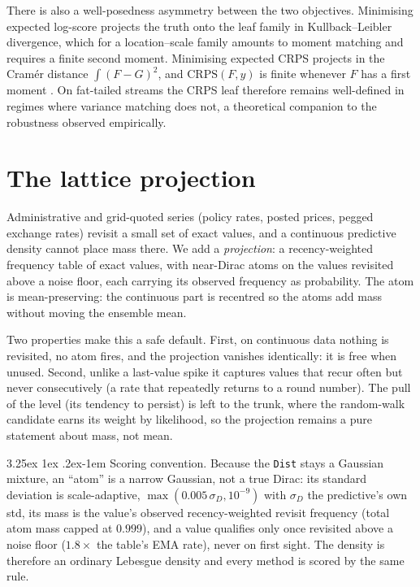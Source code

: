 \documentclass[article]{jss}
\makeatletter
\renewcommand\paragraph{\@startsection{paragraph}{4}{\z@}%
  {3.25ex \@plus1ex \@minus.2ex}{-1em}%
  {\normalfont\normalsize\itshape}}
\providecommand{\code}[1]{\texttt{#1}}
\makeatother
\begin{document}
There is also a well-posedness asymmetry between the two objectives.
Minimising expected log-score projects the truth onto the leaf family in
Kullback--Leibler divergence, which for a location--scale family amounts to
moment matching and requires a finite second moment. Minimising expected CRPS
projects in the Cram\'er distance $\int (F-G)^2$, and $\mathrm{CRPS}(F,y)$ is
finite whenever $F$ has a first moment \citep{gneiting2007strictly}. On
fat-tailed streams the CRPS leaf therefore remains well-defined in regimes
where variance matching does not, a theoretical companion to the robustness
observed empirically.

\section{The lattice projection} \label{sec:lattice}

Administrative and grid-quoted series (policy rates, posted prices, pegged
exchange rates) revisit a small set of exact values, and a continuous
predictive density cannot place mass there. We add a \emph{projection}: a
recency-weighted frequency table of exact values, with near-Dirac atoms on the
values revisited above a noise floor, each carrying its observed frequency as
probability. The atom is mean-preserving: the continuous part is
recentred so the atoms add mass without moving the ensemble mean.

Two properties make this a safe default. First, on continuous data nothing is
revisited, no atom fires, and the projection vanishes identically: it is free
when unused. Second, unlike a last-value spike it captures values that recur
often but never consecutively (a rate that repeatedly returns to a round number).
The pull of the level (its tendency to persist) is left to the trunk, where the
random-walk candidate earns its weight by likelihood, so the projection remains a
pure statement about mass, not mean.

\paragraph{Scoring convention.}
Because the \code{Dist} stays a Gaussian mixture, an ``atom'' is a narrow
Gaussian, not a true Dirac: its standard deviation is scale-adaptive,
$\max(0.005\,\sigma_D, 10^{-9})$ with $\sigma_D$ the predictive's own std, its
mass is the value's observed recency-weighted revisit frequency (total atom mass
capped at $0.999$), and a value qualifies only once revisited above a noise
floor ($1.8\times$ the table's EMA rate), never on first sight. The density is
therefore an ordinary Lebesgue density and every method is scored by the same
rule.
\end{document}
